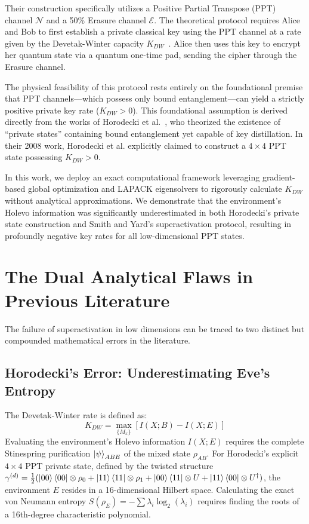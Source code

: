 \documentclass[twocolumn,prl,aps,superscriptaddress,floatfix]{revtex4-2}
\begin{document}
Their construction specifically utilizes a Positive Partial Transpose (PPT) channel $\mathcal{N}$ and a 50\% Erasure channel $\mathcal{E}$. The theoretical protocol requires Alice and Bob to first establish a private classical key using the PPT channel at a rate given by the Devetak-Winter capacity $K_{DW}$~\cite{DevetakWinter2005}. Alice then uses this key to encrypt her quantum state via a quantum one-time pad, sending the cipher through the Erasure channel. 

The physical feasibility of this protocol rests entirely on the foundational premise that PPT channels---which possess only bound entanglement---can yield a strictly positive private key rate ($K_{DW} > 0$). This foundational assumption is derived directly from the works of Horodecki et al.~\cite{Horodecki2005, Horodecki2008}, who theorized the existence of ``private states'' containing bound entanglement yet capable of key distillation. In their 2008 work, Horodecki et al. explicitly claimed to construct a $4 \times 4$ PPT state possessing $K_{DW} > 0$. 

In this work, we deploy an exact computational framework leveraging gradient-based global optimization and LAPACK eigensolvers to rigorously calculate $K_{DW}$ without analytical approximations. We demonstrate that the environment's Holevo information was significantly underestimated in both Horodecki's private state construction and Smith and Yard's superactivation protocol, resulting in profoundly negative key rates for all low-dimensional PPT states. 

\section{The Dual Analytical Flaws in Previous Literature}

The failure of superactivation in low dimensions can be traced to two distinct but compounded mathematical errors in the literature.

\subsection{Horodecki's Error: Underestimating Eve's Entropy}
The Devetak-Winter rate is defined as:
\begin{equation}
K_{DW} = \max_{\{M_x\}} [I(X; B) - I(X; E)]
\end{equation}
Evaluating the environment's Holevo information $I(X;E)$ requires the complete Stinespring purification $\ket{\psi}_{ABE}$ of the mixed state $\rho_{AB}$. For Horodecki's explicit $4 \times 4$ PPT private state, defined by the twisted structure $\gamma^{(d)} = \frac{1}{2} ( \ket{00}\bra{00} \otimes \rho_0 + \ket{11}\bra{11} \otimes \rho_1 + \ket{00}\bra{11} \otimes U + \ket{11}\bra{00} \otimes U^\dagger )$, the environment $E$ resides in a 16-dimensional Hilbert space. Calculating the exact von Neumann entropy $S(\rho_E) = - \sum \lambda_i \log_2(\lambda_i)$ requires finding the roots of a 16th-degree characteristic polynomial.
\end{document}
